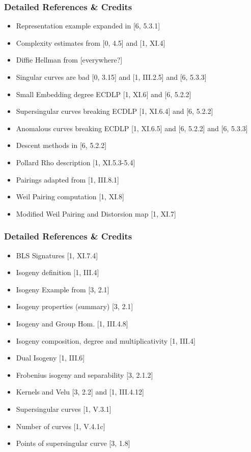 \documentclass{beamer}
\begin{document}
\begin{frame}[noframenumbering]
    \frametitle{Detailed References \& Credits}
    \begin{itemize}
    \item Representation example expanded in [6, 5.3.1]
       \item Complexity estimates from [0, 4.5] and [1, XI.4]
       \item Diffie Hellman from [everywhere?]
       \item Singular curves are bad [0, 3.15] and [1, III.2.5] and [6, 5.3.3]
       \item Small Embedding degree ECDLP [1, XI.6] and [6, 5.2.2]
       \item Supersingular curves breaking ECDLP [1, XI.6.4] and [6, 5.2.2]
       \item Anomalous curves breaking ECDLP [1, XI.6.5] and [6, 5.2.2] and [6, 5.3.3]
       \item Descent methods in [6, 5.2.2]
        \item Pollard Rho description [1, XI.5.3-5.4]
        \item Pairings adapted from [1, III.8.1]
        \item Weil Pairing computation [1, XI.8]
        \item Modified Weil Pairing and Distorsion map [1, XI.7]
      \end{itemize}
\end{frame}

\begin{frame}[noframenumbering]
    \frametitle{Detailed References \& Credits}
    \begin{itemize}
       
        
        \item BLS Signatures [1, XI.7.4]
        \item Isogeny definition [1, III.4]
        \item Isogeny Example from [3, 2.1]
        \item Isogeny properties (summary) [3, 2.1]
        \item Isogeny and Group Hom. [1, III.4.8]
        \item Isogeny composition, degree and multiplicativity [1, III.4]
        \item Dual Isogeny [1, III.6]
        \item Frobenius isogeny and separability [3, 2.1.2]
        \item Kernels and Velu [3, 2.2] and [1, III.4.12]
        \item Supersingular curves [1, V.3.1]
        \item Number of curves [1, V.4.1c]
        \item Points of supersingular curve [3, 1.8]
      \end{itemize}
\end{frame}
\end{document}
